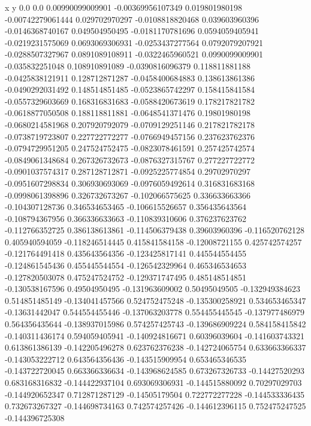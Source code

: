               x                y
            0.0              0.0
0.00990099009901  -0.00369956107349
 0.019801980198  -0.00742279061444
 0.029702970297  -0.0108818820468
 0.039603960396  -0.0146368740167
 0.049504950495  -0.0181170781696
0.0594059405941  -0.0219231575069
0.0693069306931  -0.0253437277564
0.0792079207921  -0.0288507327967
0.0891089108911  -0.0322465960521
0.0990099009901  -0.035832251048
 0.108910891089  -0.0390816096379
 0.118811881188  -0.0425838121911
 0.128712871287  -0.0458400684883
 0.138613861386  -0.0490292031492
 0.148514851485  -0.0523865742297
 0.158415841584  -0.0557329603669
 0.168316831683  -0.0588420673619
 0.178217821782  -0.0618877050508
 0.188118811881  -0.0648541371476
  0.19801980198  -0.0680214581968
 0.207920792079  -0.0709129251146
 0.217821782178  -0.0738719723807
 0.227722772277  -0.0766949457156
 0.237623762376  -0.0794729951205
 0.247524752475  -0.0823078461591
 0.257425742574  -0.0849061348684
 0.267326732673  -0.0876327315767
 0.277227722772  -0.0901037574317
 0.287128712871  -0.0925225774854
  0.29702970297  -0.0951607298834
 0.306930693069  -0.0976059492614
 0.316831683168  -0.0998061398896
 0.326732673267  -0.102066575625
 0.336633663366  -0.104307128736
 0.346534653465  -0.106615526657
 0.356435643564  -0.108794367956
 0.366336633663  -0.110839310606
 0.376237623762  -0.112766352725
 0.386138613861  -0.114506379438
  0.39603960396  -0.116520762128
 0.405940594059  -0.118246514445
 0.415841584158   -0.12008721155
 0.425742574257  -0.121764491418
 0.435643564356  -0.123425817141
 0.445544554455  -0.124861545436
 0.455445544554  -0.126542329964
 0.465346534653  -0.127820503078
 0.475247524752  -0.129371747495
 0.485148514851  -0.130538167596
  0.49504950495  -0.131963609002
  0.50495049505  -0.132949384623
 0.514851485149  -0.134041457566
 0.524752475248  -0.135300258921
 0.534653465347   -0.13631442047
 0.544554455446  -0.137063203778
 0.554455445545  -0.137977486979
 0.564356435644  -0.138937015986
 0.574257425743  -0.139686909224
 0.584158415842  -0.140311436174
 0.594059405941  -0.140924816671
  0.60396039604  -0.141603743321
 0.613861386139  -0.142205496278
 0.623762376238  -0.142724065754
 0.633663366337  -0.143053222712
 0.643564356436  -0.143515909954
 0.653465346535  -0.143722720045
 0.663366336634  -0.143968624585
 0.673267326733   -0.14427520293
 0.683168316832  -0.144422937104
 0.693069306931  -0.144515880092
  0.70297029703  -0.144920652347
 0.712871287129   -0.14505179504
 0.722772277228  -0.144533336435
 0.732673267327  -0.144698734163
 0.742574257426  -0.144612396115
 0.752475247525  -0.144396725308
